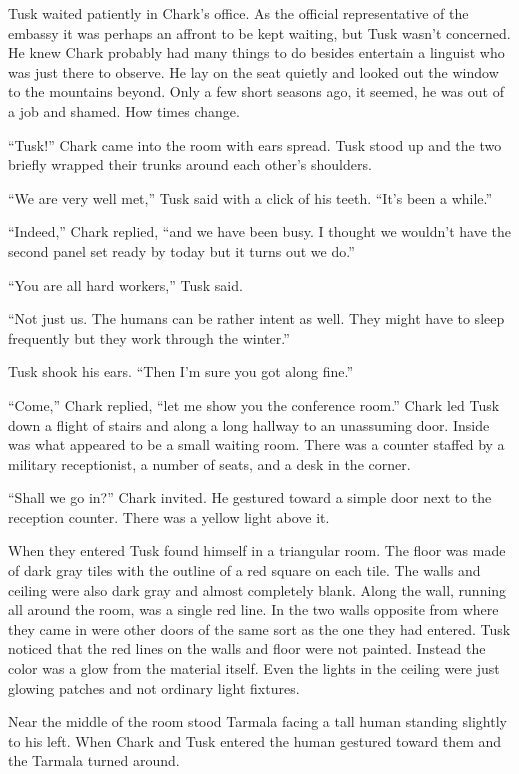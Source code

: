 
Tusk waited patiently in Chark's office. As the official representative of the embassy it was
perhaps an affront to be kept waiting, but Tusk wasn't concerned. He knew Chark probably had
many things to do besides entertain a linguist who was just there to observe. He lay on the seat
quietly and looked out the window to the mountains beyond. Only a few short seasons ago, it
seemed, he was out of a job and shamed. How times change.

``Tusk!'' Chark came into the room with ears spread. Tusk stood up and the two briefly wrapped
their trunks around each other's shoulders.

``We are very well met,'' Tusk said with a click of his teeth. ``It's been a while.''

``Indeed,'' Chark replied, ``and we have been busy. I thought we wouldn't have the second panel
set ready by today but it turns out we do.''

``You are all hard workers,'' Tusk said.

``Not just us. The humans can be rather intent as well. They might have to sleep frequently but
they work through the winter.''

Tusk shook his ears. ``Then I'm sure you got along fine.''

``Come,'' Chark replied, ``let me show you the conference room.'' Chark led Tusk down a flight
of stairs and along a long hallway to an unassuming door. Inside was what appeared to be a small
waiting room. There was a counter staffed by a military receptionist, a number of seats, and a
desk in the corner.

``Shall we go in?'' Chark invited. He gestured toward a simple door next to the reception
counter. There was a yellow light above it.

When they entered Tusk found himself in a triangular room. The floor was made of dark gray tiles
with the outline of a red square on each tile. The walls and ceiling were also dark gray and
almost completely blank. Along the wall, running all around the room, was a single red line. In
the two walls opposite from where they came in were other doors of the same sort as the one they
had entered. Tusk noticed that the red lines on the walls and floor were not painted. Instead
the color was a glow from the material itself. Even the lights in the ceiling were just glowing
patches and not ordinary light fixtures.

Near the middle of the room stood Tarmala facing a tall human standing slightly to his left.
When Chark and Tusk entered the human gestured toward them and the Tarmala turned around.


